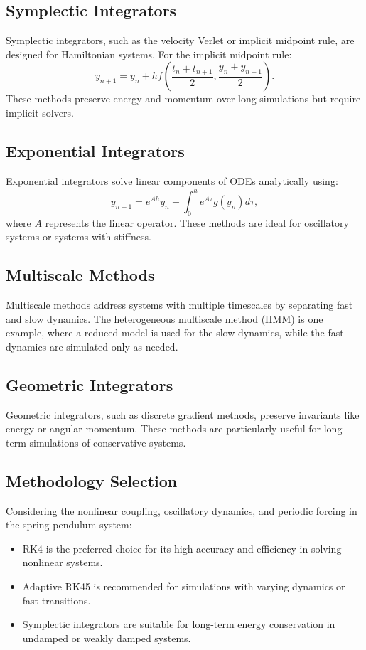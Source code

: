 \documentclass[12pt]{article}
\begin{document}
\subsection{Symplectic Integrators}
Symplectic integrators, such as the velocity Verlet or implicit midpoint rule, are designed for Hamiltonian systems. For the implicit midpoint rule:
\[
y_{n+1} = y_n + h f\left(\frac{t_n + t_{n+1}}{2}, \frac{y_n + y_{n+1}}{2}\right).
\]
These methods preserve energy and momentum over long simulations but require implicit solvers.

\subsection{Exponential Integrators}
Exponential integrators solve linear components of ODEs analytically using:
\[
y_{n+1} = e^{Ah}y_n + \int_0^h e^{A\tau}g(y_n)d\tau,
\]
where \( A \) represents the linear operator. These methods are ideal for oscillatory systems or systems with stiffness.

\subsection{ Multiscale Methods}
Multiscale methods address systems with multiple timescales by separating fast and slow dynamics. The heterogeneous multiscale method (HMM) is one example, where a reduced model is used for the slow dynamics, while the fast dynamics are simulated only as needed.

\subsection{Geometric Integrators}
Geometric integrators, such as discrete gradient methods, preserve invariants like energy or angular momentum. These methods are particularly useful for long-term simulations of conservative systems.

\subsection{Methodology Selection}
Considering the nonlinear coupling, oscillatory dynamics, and periodic forcing in the spring pendulum system:
\begin{itemize}
    \item RK4 is the preferred choice for its high accuracy and efficiency in solving nonlinear systems.
    \item Adaptive RK45 is recommended for simulations with varying dynamics or fast transitions.
    \item Symplectic integrators are suitable for long-term energy conservation in undamped or weakly damped systems.
\end{itemize}
\end{document}
